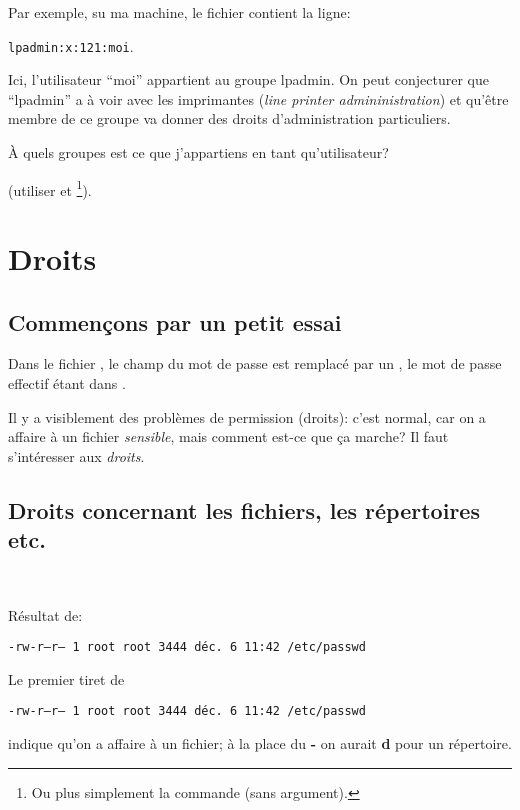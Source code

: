 Par exemple, su ma machine, le fichier  contient la ligne:

\texttt{lpadmin:x:121:moi}.

Ici, l'utilisateur ``moi''
appartient au groupe lpadmin. On peut conjecturer que ``lpadmin'' a à
voir avec les imprimantes (\textsl{line printer admininistration}) et
qu'être membre de ce groupe va donner des 
droits d'administration particuliers.



\exo{}
\`A quels groupes est ce que j'appartiens en tant qu'utilisateur?

(utiliser  et \footnote{Ou plus simplement
  la commande  (sans argument).}).
\section{Droits}
\subsection{Commençons par un petit essai}
Dans le fichier , le champ du mot de passe est
remplacé par un , le mot de passe effectif étant dans
.

\smallskip

Il y a visiblement des problèmes de permission (droits): c'est normal,
car on a affaire à un fichier \textsl{sensible},
mais comment est-ce que ça marche? Il faut s'intéresser aux \emph{droits}.
\subsection{Droits concernant les fichiers, les répertoires etc.}~


Résultat de:


\begin{center}
\large\texttt{-rw-r---r--- 1 root root 3444 déc. 6 11:42 /etc/passwd}
\end{center}

Le premier tiret de


\begin{center}
\texttt{-rw-r---r--- 1 root root 3444
  déc. 6 11:42 /etc/passwd}
\end{center}

indique qu'on a affaire à un fichier;
  à la place du \textbf{-} on aurait \textbf{d} pour un
  répertoire.


